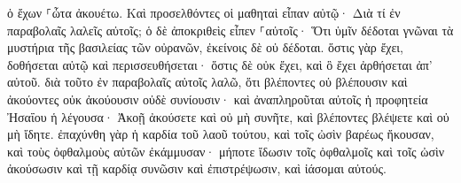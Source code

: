 \documentclass{openreader}
\begin{document}
ὁ ἔχων ⸀ὦτα ἀκουέτω. 
Καὶ προσελθόντες οἱ μαθηταὶ εἶπαν αὐτῷ· Διὰ τί ἐν παραβολαῖς λαλεῖς αὐτοῖς; 
ὁ δὲ ἀποκριθεὶς εἶπεν ⸀αὐτοῖς· Ὅτι ὑμῖν δέδοται γνῶναι τὰ μυστήρια τῆς βασιλείας τῶν οὐρανῶν, ἐκείνοις δὲ οὐ δέδοται. 
ὅστις γὰρ ἔχει, δοθήσεται αὐτῷ καὶ περισσευθήσεται· ὅστις δὲ οὐκ ἔχει, καὶ ὃ ἔχει ἀρθήσεται ἀπ’ αὐτοῦ. 
διὰ τοῦτο ἐν παραβολαῖς αὐτοῖς λαλῶ, ὅτι βλέποντες οὐ βλέπουσιν καὶ ἀκούοντες οὐκ ἀκούουσιν οὐδὲ συνίουσιν· 
καὶ ἀναπληροῦται αὐτοῖς ἡ προφητεία Ἠσαΐου ἡ λέγουσα· Ἀκοῇ ἀκούσετε καὶ οὐ μὴ συνῆτε, καὶ βλέποντες βλέψετε καὶ οὐ μὴ ἴδητε. 
ἐπαχύνθη γὰρ ἡ καρδία τοῦ λαοῦ τούτου, καὶ τοῖς ὠσὶν βαρέως ἤκουσαν, καὶ τοὺς ὀφθαλμοὺς αὐτῶν ἐκάμμυσαν· μήποτε ἴδωσιν τοῖς ὀφθαλμοῖς καὶ τοῖς ὠσὶν ἀκούσωσιν καὶ τῇ καρδίᾳ συνῶσιν καὶ ἐπιστρέψωσιν, καὶ ἰάσομαι αὐτούς. 
\end{document}
